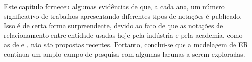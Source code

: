 Este capítulo forneceu algumas evidências de que, a cada ano, um número significativo de trabalhos apresentando diferentes tipos de notações é publicado.
Isso é de certa forma surpreendente, devido ao fato de que as notações de relacionamento entre entidade usadas hoje pela indústria e pela academia, como as de  e , não são propostas recentes.
Portanto, conclui-se que a modelagem de \ac{ER} continua um amplo campo de pesquisa com algumas lacunas a serem exploradas.

